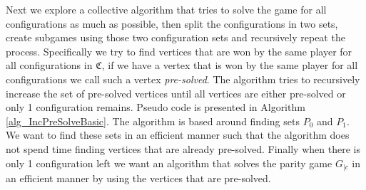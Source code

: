 Next we explore a collective algorithm that tries to solve the game for all configurations as much as possible, then split the configurations in two sets, create subgames using those two configuration sets and recursively repeat the process. Specifically we try to find vertices that are won by the same player for all configurations in $\mathfrak{C}$, if we have a vertex that is won by the same player for all configurations we call such a vertex \textit{pre-solved}. The algorithm tries to recursively increase the set of pre-solved vertices until all vertices are either pre-solved or only 1 configuration remains. Pseudo code is presented in Algorithm \ref{alg_IncPreSolveBasic}. The algorithm is based around finding sets $P_0$ and $P_1$. We want to find these sets in an efficient manner such that the algorithm does not spend time finding vertices that are already pre-solved. Finally when there is only 1 configuration left we want an algorithm that solves the parity game $G_{|c}$ in an efficient manner by using the vertices that are pre-solved.

